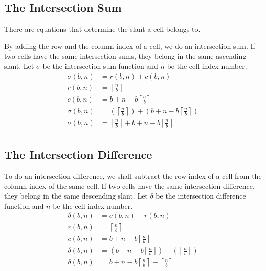 \documentclass[letterpaper, twoside,12pt]{article}
\begin{document}
    \subsection{The Intersection Sum}
    There are equations that determine the slant a cell belongs to.

    By adding the row and the column index of a cell, we do an intersection sum. If two cells have the same intersection sums, they belong in the same ascending slant. Let $\sigma$ be the intersection sum function and $n$ be the cell index number.
    \begin{equation}
        \begin{split}
            \sigma(b,n) &= r(b,n) + c(b,n) \\
            r(b,n) &= \left\lceil \frac{n}{b} \right\rceil \\
            c(b,n) &= b + n - b\left\lceil \frac{n}{b} \right\rceil \\
            \sigma(b,n) &= ( \left\lceil \frac{n}{b} \right\rceil ) + (b + n - b\left\lceil \frac{n}{b} \right\rceil)\\
            \sigma(b,n) &= \left\lceil \frac{n}{b} \right\rceil + b + n - b\left\lceil \frac{n}{b} \right\rceil\\
        \end{split}
    \end{equation}

    \subsection{The Intersection Difference}
    To do an intersection difference, we shall subtract the row index of a cell from the column index of the same cell. If two cells have the same intersection difference, they belong in the same descending slant. Let $\delta$ be the intersection difference function and $n$ be the cell index number.
    \begin{equation}
        \begin{split}
            \delta(b,n) &= c(b,n) - r(b,n)\\
            r(b,n) &= \left\lceil \frac{n}{b} \right\rceil \\
            c(b,n) &= b + n - b\left\lceil \frac{n}{b} \right\rceil \\
            \delta(b,n) &= (b + n - b\left\lceil \frac{n}{b} \right\rceil) - (\left\lceil \frac{n}{b} \right\rceil)\\
            \delta(b,n) &= b + n - b\left\lceil \frac{n}{b} \right\rceil - \left\lceil \frac{n}{b} \right\rceil\\
        \end{split}
    \end{equation}
\end{document}
